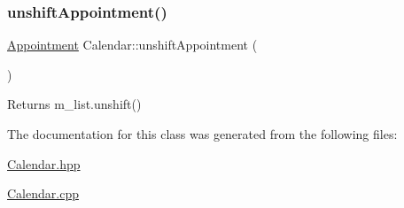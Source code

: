 \subsubsection{\texorpdfstring{unshift\+Appointment()}{unshiftAppointment()}}
{\footnotesize\ttfamily \hyperlink{classAppointment}{Appointment} Calendar\+::unshift\+Appointment (\begin{DoxyParamCaption}{ }\end{DoxyParamCaption})}

\begin{DoxyReturn}{Returns}
m\+\_\+list.\+unshift() 
\end{DoxyReturn}


The documentation for this class was generated from the following files\+:\begin{DoxyCompactItemize}
\item 
\hyperlink{Calendar_8hpp}{Calendar.\+hpp}\item 
\hyperlink{Calendar_8cpp}{Calendar.\+cpp}\end{DoxyCompactItemize}
